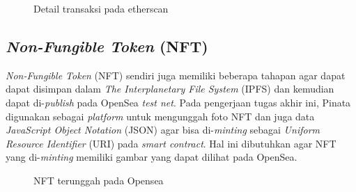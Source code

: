 \begin{figure} [H] \centering
  \caption{Detail transaksi pada etherscan}
  \label{fig:transaction}
\end{figure}

\subsection{\emph{Non-Fungible Token} (NFT)}
\emph{Non-Fungible Token} (NFT) sendiri juga memiliki beberapa tahapan agar dapat dapat disimpan dalam \emph{The Interplanetary File System} (IPFS) dan kemudian dapat di-\emph{publish} pada OpenSea \emph{test net}. Pada pengerjaan tugas akhir ini, Pinata digunakan sebagai \emph{platform} untuk mengunggah foto NFT dan juga data \emph{JavaScript Object Notation} (JSON) agar bisa di-\emph{minting} sebagai \emph{Uniform Resource Identifier} (URI) pada \emph{smart contract}. Hal ini dibutuhkan agar NFT yang di-\emph{minting} memiliki gambar yang dapat dilihat pada OpenSea.

\begin{figure} [H] \centering
  \caption{NFT terunggah pada Opensea}
  \label{fig:opensea}
\end{figure}

